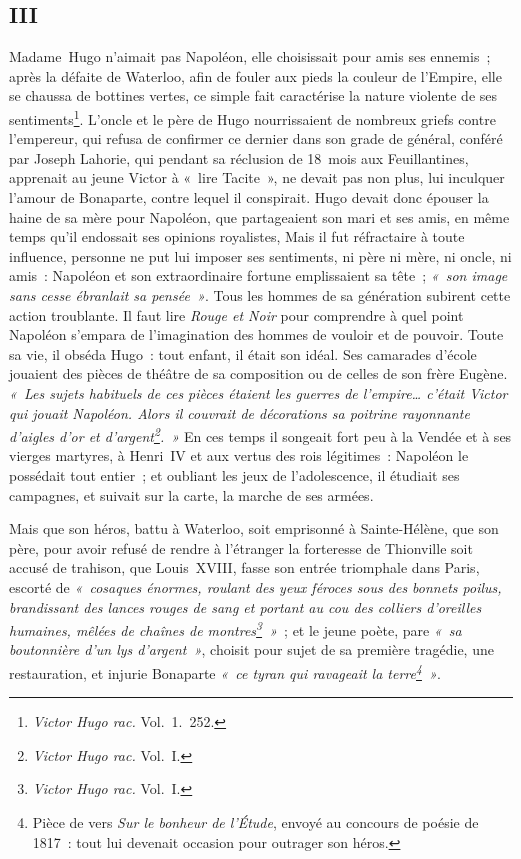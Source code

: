 \documentclass[french,twoside]{book} %
\begin{document}
\subsection[{III}]{III}
\noindent Madame Hugo n’aimait pas Napoléon, elle choisissait pour amis ses ennemis ; après la défaite de Waterloo, afin de fouler aux pieds la couleur de l’Empire, elle se chaussa de bottines vertes, ce  
\label{p16}simple fait caractérise la nature violente de ses sentiments\footnote{\emph{Victor Hugo rac.} Vol. 1. 252.}. L’oncle et le père de Hugo nourrissaient de nombreux griefs contre l’empereur, qui refusa de confirmer ce dernier dans son grade de général, conféré par Joseph Lahorie, qui pendant sa réclusion de 18 mois aux Feuillantines, apprenait au jeune Victor à « lire Tacite », ne devait pas non plus, lui inculquer l’amour de Bonaparte, contre lequel il conspirait. Hugo devait donc épouser la haine de sa mère pour Napoléon, que partageaient son mari et ses amis, en même temps qu’il endossait ses opinions royalistes, Mais il fut réfractaire à toute influence, personne ne put lui imposer ses sentiments, ni père ni mère, ni oncle, ni amis : Napoléon et son extraordinaire fortune emplissaient sa tête ; \emph{« son image sans cesse ébranlait sa pensée »}. Tous les hommes de sa génération subirent cette action troublante. Il faut lire \emph{Rouge et Noir} pour comprendre à quel point Napoléon s’empara de l’imagination des hommes de vouloir et de pouvoir. Toute sa vie, il obséda Hugo : tout enfant, il était son idéal. Ses camarades d’école jouaient des pièces de théâtre de sa composition ou de celles de son frère Eugène. \emph{« Les sujets habituels de ces pièces étaient les guerres de l’empire… c’était Victor qui jouait Napoléon. Alors il couvrait de décorations sa poitrine rayonnante d’aigles d’or et d’argent\footnote{\emph{Victor Hugo rac.} Vol. I.}. »} En ces temps il songeait fort peu à la Vendée et à ses vierges martyres, à Henri IV et aux vertus des rois légitimes : Napoléon le possédait  
\label{p17}tout entier ; et oubliant les jeux de l’adolescence, il étudiait ses campagnes, et suivait sur la carte, la marche de ses armées.\par
Mais que son héros, battu à Waterloo, soit emprisonné à Sainte-Hélène, que son père, pour avoir refusé de rendre à l’étranger la forteresse de Thionville soit accusé de trahison, que Louis XVIII, fasse son entrée triomphale dans Paris, escorté de \emph{« cosaques énormes, roulant des yeux féroces sous des bonnets poilus, brandissant des lances rouges de sang et portant au cou des colliers d’oreilles humaines, mêlées de chaînes de montres\footnote{\emph{Victor Hugo rac.} Vol. I.} »} ; et le jeune poète, pare \emph{« sa boutonnière d’un lys d’argent »}, choisit pour sujet de sa première tragédie, une restauration, et injurie Bonaparte \emph{« ce tyran qui ravageait la terre\footnote{Pièce de vers \emph{Sur le bonheur de l’Étude}, envoyé au concours de poésie de 1817 : tout lui devenait occasion pour outrager son héros.} »}.\par
\end{document}

